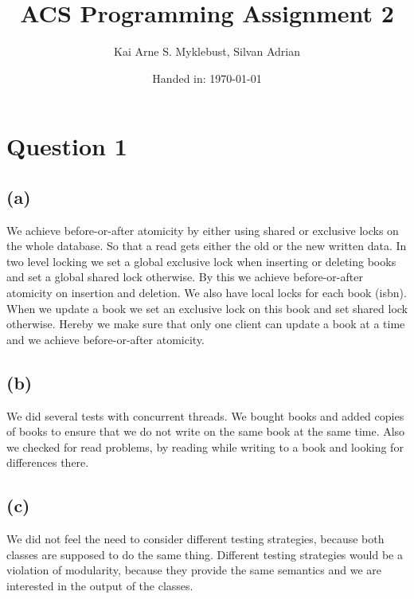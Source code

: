 \documentclass[12pt,a4paper]{article}
\begin{document}
\title{ACS Programming Assignment 2}
\subtitle{}

\author{Kai Arne S. Myklebust, Silvan Adrian}
\date{Handed in: \today}
	
\maketitle
\tableofcontents

\section{Question 1}
\subsection{(a)}
We achieve before-or-after atomicity by either using shared or exclusive locks on the whole database. So that a read gets either the old or the new written data.
In two level locking we set a global exclusive lock when inserting or deleting books and set a global shared lock otherwise. By this we achieve before-or-after atomicity on insertion and deletion. We also have local locks for each book (isbn). When we update a book we set an exclusive lock on this book and set shared lock otherwise. Hereby we make sure that only one client can update a book at a time and we achieve before-or-after atomicity.

\subsection{(b)}
We did several tests with concurrent threads. We bought books and added copies of books to ensure that we do not write on the same book at the same time. Also we checked for read problems, by reading while writing to a book and looking for differences there.

\subsection{(c)}
We did not feel the need to consider different testing strategies, because both classes are supposed to do the same thing. Different testing strategies would be a violation of modularity, because they provide the same semantics and we are interested in the output of the classes.
\end{document}
